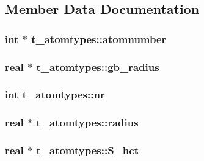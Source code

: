 \subsection{\-Member \-Data \-Documentation}
\hypertarget{structt__atomtypes_a6809b9b7dff7d7bf3633465f449cf02d}{
\subsubsection[{atomnumber}]{\setlength{\rightskip}{0pt plus 5cm}int $\ast$ {\bf t\-\_\-atomtypes\-::atomnumber}}}\label{structt__atomtypes_a6809b9b7dff7d7bf3633465f449cf02d}
\hypertarget{structt__atomtypes_a7f7c7a349783f95a7a8b0b9037305f54}{
\subsubsection[{gb\-\_\-radius}]{\setlength{\rightskip}{0pt plus 5cm}real $\ast$ {\bf t\-\_\-atomtypes\-::gb\-\_\-radius}}}\label{structt__atomtypes_a7f7c7a349783f95a7a8b0b9037305f54}
\hypertarget{structt__atomtypes_a31a9503bb134378f237eaea5f535b4b6}{
\subsubsection[{nr}]{\setlength{\rightskip}{0pt plus 5cm}int {\bf t\-\_\-atomtypes\-::nr}}}\label{structt__atomtypes_a31a9503bb134378f237eaea5f535b4b6}
\hypertarget{structt__atomtypes_aefbd594619ed9eff4f331f2211be34fb}{
\subsubsection[{radius}]{\setlength{\rightskip}{0pt plus 5cm}real $\ast$ {\bf t\-\_\-atomtypes\-::radius}}}\label{structt__atomtypes_aefbd594619ed9eff4f331f2211be34fb}
\hypertarget{structt__atomtypes_af769370dbcc8597b2cb20faa1d5f15b2}{
\subsubsection[{\-S\-\_\-hct}]{\setlength{\rightskip}{0pt plus 5cm}real $\ast$ {\bf t\-\_\-atomtypes\-::\-S\-\_\-hct}}}\label{structt__atomtypes_af769370dbcc8597b2cb20faa1d5f15b2}
